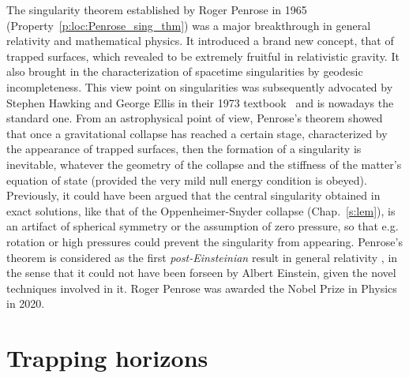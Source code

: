 \begin{hist}
The singularity theorem established by Roger Penrose
in 1965 \cite{Penro65} (Property~\ref{p:loc:Penrose_sing_thm})
was a major breakthrough in general relativity and mathematical physics.
It introduced a brand new concept, that of trapped surfaces, which revealed to
be extremely fruitful in relativistic gravity. It also brought in the characterization of
spacetime singularities by geodesic incompleteness. This view point on
singularities was subsequently advocated by Stephen Hawking and George Ellis in their 1973 textbook~\cite{HawkiE73} and is nowadays the standard one. From an astrophysical point of view, Penrose's theorem showed that
once a gravitational collapse has reached a certain stage, characterized by the appearance
of trapped surfaces, then the formation of a singularity is inevitable, whatever the
geometry of the collapse and the stiffness of the matter's equation of state (provided
the very mild null energy condition is obeyed). Previously, it could have been
argued that the central singularity obtained in exact solutions, like that
of the Oppenheimer-Snyder collapse (Chap.~\ref{s:lem}), is an artifact of spherical
symmetry or the assumption of zero pressure, so that e.g. rotation or high pressures could
prevent the singularity from appearing.
Penrose's theorem is considered as the
first \emph{post-Einsteinian} result in general relativity \cite{SenovG15,Senov22a},
in the sense that it could not have been forseen by Albert Einstein,
given the novel techniques involved in it. Roger Penrose was awarded the Nobel Prize in Physics
in 2020.
\end{hist}



\section{Trapping horizons}


